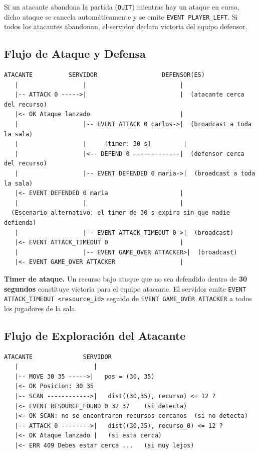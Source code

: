 \documentclass[12pt, letterpaper]{article}
\begin{document}
\begin{nota}
Si un atacante abandona la partida (\texttt{QUIT}) mientras hay un ataque en curso,
dicho ataque se cancela automáticamente y se emite \texttt{EVENT PLAYER\_LEFT}.
Si todos los atacantes abandonan, el servidor declara victoria del equipo defensor.
\end{nota}

\subsection{Flujo de Ataque y Defensa}

\begin{lstlisting}
ATACANTE          SERVIDOR                  DEFENSOR(ES)
   |                  |                          |
   |-- ATTACK 0 ----->|                          |  (atacante cerca del recurso)
   |<- OK Ataque lanzado                         |
   |                  |-- EVENT ATTACK 0 carlos->|  (broadcast a toda la sala)
   |                  |     [timer: 30 s]         |
   |                  |<-- DEFEND 0 -------------|  (defensor cerca del recurso)
   |                  |-- EVENT DEFENDED 0 maria->|  (broadcast a toda la sala)
   |<- EVENT DEFENDED 0 maria                    |
   |                  |                          |
  (Escenario alternativo: el timer de 30 s expira sin que nadie defienda)
   |                  |-- EVENT ATTACK_TIMEOUT 0->|  (broadcast)
   |<- EVENT ATTACK_TIMEOUT 0                    |
   |                  |-- EVENT GAME_OVER ATTACKER>|  (broadcast)
   |<- EVENT GAME_OVER ATTACKER                  |
\end{lstlisting}

\begin{nota}
\textbf{Timer de ataque.} Un recurso bajo ataque que no sea defendido dentro de
\textbf{30 segundos} constituye victoria para el equipo atacante. El servidor emite
\texttt{EVENT ATTACK\_TIMEOUT <resource\_id>} seguido de \texttt{EVENT GAME\_OVER ATTACKER}
a todos los jugadores de la sala.
\end{nota}

\subsection{Flujo de Exploración del Atacante}

\begin{lstlisting}
ATACANTE              SERVIDOR
   |                     |
   |-- MOVE 30 35 ----->|   pos = (30, 35)
   |<- OK Posicion: 30 35
   |-- SCAN ------------>|   dist((30,35), recurso) <= 12 ?
   |<- EVENT RESOURCE_FOUND 0 32 37    (si detecta)
   |<- OK SCAN: no se encontraron recursos cercanos  (si no detecta)
   |-- ATTACK 0 -------->|   dist((30,35), recurso_0) <= 12 ?
   |<- OK Ataque lanzado |   (si esta cerca)
   |<- ERR 409 Debes estar cerca ...   (si muy lejos)
\end{lstlisting}
\end{document}
